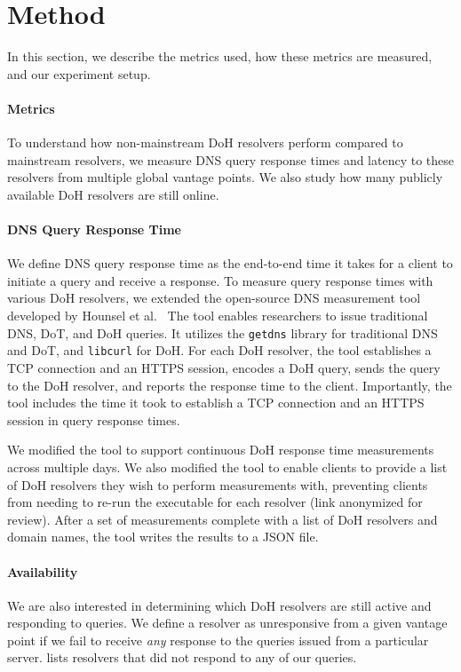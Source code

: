 \section{Method}\label{sec:method}
In this section, we describe the metrics used, how these metrics are measured, and our experiment setup.

\paragraph{Metrics}
To understand how non-mainstream DoH resolvers perform compared to mainstream resolvers, we measure DNS query response times and latency to these resolvers from multiple global vantage points.
We also study how many publicly available DoH resolvers are still online.

\paragraph{DNS Query Response Time}
We define DNS query response time as the end-to-end time it takes for a client to initiate a query and receive a response.
To measure query response times with various DoH resolvers, we extended the
open-source DNS measurement tool developed by Hounsel et al.~\cite{hounsel2020comparing}
The tool enables researchers to issue traditional DNS, DoT, and DoH queries.
It utilizes the \texttt{getdns} library for traditional DNS and DoT, and \texttt{libcurl} for DoH.
For each DoH resolver, the tool establishes a TCP connection and an HTTPS session, encodes a DoH query, sends the query to the DoH resolver, and reports the response time to the client.
Importantly, the tool includes the time it took to establish a TCP connection and an HTTPS session in query response times.

We modified the tool to support continuous DoH response time measurements across multiple days.
We also modified the tool to enable clients to provide a list of DoH resolvers
they wish to perform measurements with, preventing clients from needing to
re-run the executable for each resolver (link anonymized for review).
After a set of measurements complete with a list of DoH resolvers and domain names, the tool writes the results to a JSON file.

\paragraph{Availability}
We are also interested in determining which DoH resolvers are still active and responding to queries.
We define a resolver as unresponsive from a given vantage point if we fail to receive \emph{any} response to the queries issued from a particular server.
 lists resolvers that did not respond to any of our queries.



